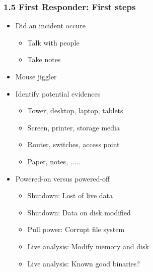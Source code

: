 \begin{frame}
  \frametitle{1.5 First Responder: First steps}
  \begin{itemize}
      \item Did an incident occure
      \begin{itemize}
          \item Talk with people
          \item Take notes
      \end{itemize}
      \item Mouse jiggler
      \item Identify potential evidences
      \begin{itemize}
          \item Tower, desktop, laptop, tablets
          \item Screen, printer, storage media
          \item Router, switches, access point
          \item Paper, notes, .....
      \end{itemize}
      \item Powered-on versus powered-off
      \begin{itemize}
          \item Shutdown: Lost of live data
          \item Shutdown: Data on disk modified
          \item Pull power: Corrupt file system
          \item Live analysis: Modify memory and disk
          \item Live analysis: Known good binaries?
      \end{itemize}
  \end{itemize}
\end{frame}


